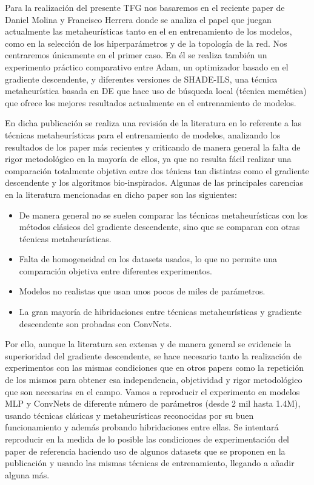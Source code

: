 Para la realización del presente TFG nos basaremos en el reciente paper de Daniel Molina y Francisco Herrera \cite{MHtrainingClase} donde se analiza el papel que juegan actualmente las metaheurísticas tanto en el en entrenamiento de los modelos, como en la selección de los hiperparámetros y de la topología de la red. Nos centraremos únicamente en el primer caso. En él se realiza también un experimento práctico comparativo entre Adam, un optimizador basado en el gradiente descendente, y diferentes versiones de SHADE-ILS, una técnica metaheurística basada en DE que hace uso de búsqueda local (técnica memética) que ofrece los mejores resultados actualmente en el entrenamiento de modelos.

En dicha publicación se realiza una revisión de la literatura en lo referente a las técnicas metaheurísticas para el entrenamiento de modelos, analizando los resultados de los paper más recientes y criticando de manera general la falta de rigor metodológico en la mayoría de ellos, ya que no resulta fácil realizar una comparación totalmente objetiva entre dos ténicas tan distintas como el gradiente descendente y los algoritmos bio-inspirados. Algunas de las principales carencias en la literatura mencionadas en dicho paper son las siguientes:

\begin{itemize}

\item De manera general no se suelen comparar las técnicas metaheurísticas con los métodos clásicos del gradiente descendente, sino que se comparan con otras técnicas metaheurísticas.

\item Falta de homogeneidad en los datasets usados, lo que no permite una comparación objetiva entre diferentes experimentos.

\item Modelos no realistas que usan unos pocos de miles de parámetros.

\item La gran mayoría de hibridaciones entre técnicas metaheurísticas y gradiente descendente son probadas con ConvNets.

\end{itemize}

Por ello, aunque la literatura sea extensa y de manera general se evidencie la superioridad del gradiente descendente, se hace necesario tanto la realización de experimentos con las mismas condiciones que en otros papers como la repetición de los mismos para obtener esa independencia, objetividad y rigor metodológico que son necesarias en el campo. Vamos a reproducir el experimento en modelos MLP y ConvNets de diferente número de parámetros (desde 2 mil hasta 1.4M), usando técnicas clásicas y metaheurísticas reconocidas por su buen funcionamiento y además probando hibridaciones entre ellas. Se intentará reproducir en la medida de lo posible las condiciones de experimentación del paper de referencia haciendo uso de algunos datasets que se proponen en la publicación y usando las mismas técnicas de entrenamiento, llegando a añadir alguna más.



